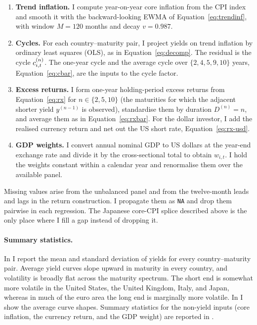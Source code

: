 \begin{enumerate}[leftmargin=1.6em]
  \item \textbf{Trend inflation.} I compute year-on-year core inflation from
    the CPI index and smooth it with the backward-looking EWMA
    of Equation~\eqref{eq:trendinf}, with window $M=120$ months and decay $v=0.987$.
  \item \textbf{Cycles.} For each country--maturity pair, I project yields on
    trend inflation by ordinary least squares (OLS), as in
    Equation~\eqref{eq:decomp}. The residual is the cycle
    $c^{(n)}_{i,t}$. The one-year cycle and the average cycle over
    $\{2,4,5,9,10\}$ years, Equation~\eqref{eq:cbar}, are the inputs to the cycle
    factor.
  \item \textbf{Excess returns.} I form one-year holding-period excess returns
    from Equation~\eqref{eq:rx} for $n\in\{2,5,10\}$ (the maturities for which the adjacent
    shorter yield $y^{(n-1)}$ is observed), standardise them by duration
    $D^{(n)}=n$, and average them as in
    Equation~\eqref{eq:rxbar}. For the dollar investor, I
    add the realised currency return and net out the US short rate,
    Equation~\eqref{eq:rx-usd}.
  \item \textbf{GDP weights.} I convert annual nominal GDP to US dollars at
    the year-end exchange rate and divide it by the cross-sectional total to
    obtain $w_{i,t}$. I hold the weights constant within a calendar year and
    renormalise them over the available panel.
\end{enumerate}

Missing values arise from the unbalanced panel and from the twelve-month leads
and lags in the return construction. I propagate them as \texttt{NA} and drop
them pairwise in each regression. The Japanese core-CPI splice described above is
the only place where I fill a gap instead of dropping it.

\paragraph{Summary statistics.}
In  I report the mean and standard deviation of yields
for every country--maturity pair. Average yield curves slope upward in
maturity in every country, and volatility is broadly flat across the maturity
spectrum. The short end is
somewhat more volatile in the United States, the United Kingdom, Italy, and
Japan, whereas in much of the euro area the long end is marginally more
volatile. In  I show the average curve shapes.
Summary statistics for the non-yield inputs (core inflation, the currency
return, and the GDP weight) are reported in .

